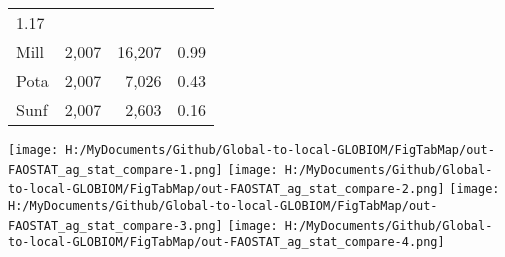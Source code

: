 \documentclass[]{article}
\begin{document}
\begin{longtable}[]{@{}lrrr@{}}
\begin{minipage}[t]{0.09\columnwidth}
1.17\strut
\end{minipage}\tabularnewline
\begin{minipage}[t]{0.16\columnwidth}\raggedright\strut
Mill\strut
\end{minipage} & \begin{minipage}[t]{0.09\columnwidth}\raggedleft\strut
2,007\strut
\end{minipage} & \begin{minipage}[t]{0.12\columnwidth}\raggedleft\strut
16,207\strut
\end{minipage} & \begin{minipage}[t]{0.09\columnwidth}\raggedleft\strut
0.99\strut
\end{minipage}\tabularnewline
\begin{minipage}[t]{0.16\columnwidth}\raggedright\strut
Pota\strut
\end{minipage} & \begin{minipage}[t]{0.09\columnwidth}\raggedleft\strut
2,007\strut
\end{minipage} & \begin{minipage}[t]{0.12\columnwidth}\raggedleft\strut
7,026\strut
\end{minipage} & \begin{minipage}[t]{0.09\columnwidth}\raggedleft\strut
0.43\strut
\end{minipage}\tabularnewline
\begin{minipage}[t]{0.16\columnwidth}\raggedright\strut
Sunf\strut
\end{minipage} & \begin{minipage}[t]{0.09\columnwidth}\raggedleft\strut
2,007\strut
\end{minipage} & \begin{minipage}[t]{0.12\columnwidth}\raggedleft\strut
2,603\strut
\end{minipage} & \begin{minipage}[t]{0.09\columnwidth}\raggedleft\strut
0.16\strut
\end{minipage}\tabularnewline
\bottomrule
\end{longtable}

\texttt{[image: H:/MyDocuments/Github/Global-to-local-GLOBIOM/FigTabMap/out-FAOSTAT\_ag\_stat\_compare-1.png]}
\texttt{[image: H:/MyDocuments/Github/Global-to-local-GLOBIOM/FigTabMap/out-FAOSTAT\_ag\_stat\_compare-2.png]}
\texttt{[image: H:/MyDocuments/Github/Global-to-local-GLOBIOM/FigTabMap/out-FAOSTAT\_ag\_stat\_compare-3.png]}
\texttt{[image: H:/MyDocuments/Github/Global-to-local-GLOBIOM/FigTabMap/out-FAOSTAT\_ag\_stat\_compare-4.png]}
\end{document}
